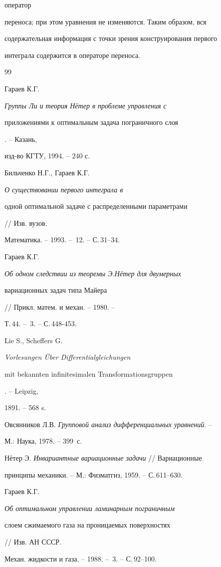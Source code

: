 оператор 


переноса; при этом уравнения не изменяются. Таким образом, вся 


содержательная информация с точки зрения конструирования первого 


интеграла содержится в операторе переноса. 





\begin{thebibliography}{99}


 




Гараев К.Г. {\em Группы Ли и теория Н\"етер в проблеме управления с 


приложениями к оптимальным задача пограничного слоя}. -- Казань, 


изд-во КГТУ, 1994. -- 240 с. 




Бильченко Н.Г., Гараев К.Г. {\em О существовании первого интеграла в 


одной оптимальной задаче с распределенными параметрами} // Изв. вузов. 


Математика. -- 1993. -- \No\,12. -- С.\,31--34. 




Гараев К.Г. {\em Об одном следствии из теоремы Э.Н\"етер для двумерных 


вариационных задач типа Майера} // Прикл. матем. и механ. -- 1980. -- 


Т.\,44. -- \No\,3. -- С.\,448-453. 




Lie S., Scheffers G. {\em Vorlesungen \"Uber Differentialgleichungen 


mit bekannten infinitesimalen Transformationsgruppen}. -- Leipzig, 


1891. -- 568 s. 




Овсянников Л.В. {\em Групповой анализ дифференциальных уравнений}. -- 


М.: Наука, 1978. -- 399~с. 




Н\"етер Э. {\em Инвариантные вариационные задачи} // Вариационные 


принципы механики. -- М.: Физматгиз, 1959. -- С.\,611--630. 




Гараев К.Г. {\em Об оптимальном управлении ламинарным пограничным 


слоем сжимаемого газа на проницаемых поверхностях} // Изв. АН СССР. 


Механ. жидкости и газа. -- 1988. -- \No\,3. -- С.\,92--100. 


 


\end{thebibliography}





